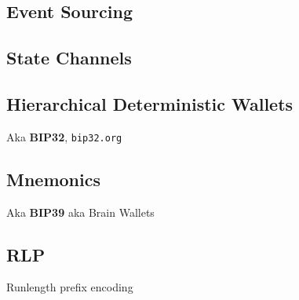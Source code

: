 
\subsection{Event Sourcing}

\subsection{State Channels}

\subsection{Hierarchical Deterministic Wallets}

Aka \textbf{BIP32}, \texttt{bip32.org}

\subsection{Mnemonics}

Aka \textbf{BIP39} aka Brain Wallets

\subsection{RLP}

Runlength prefix encoding


